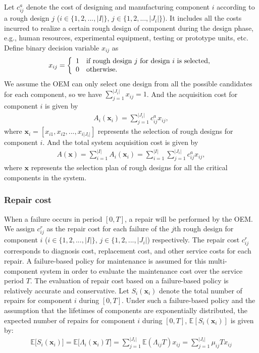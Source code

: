 \documentclass[preprint,12pt]{elsarticle}
\begin{document}
	Let $c_{ij}^{a}$ denote the cost of designing and manufacturing component $i$ according to a rough design $j$ ($i \in \{1,2,...,\lvert I \rvert\}$, $j \in \{1,2,...,\lvert J_{i}\rvert\}$). It includes all the costs incurred to realize a certain rough design of component during the design phase, e.g., human resources, experimental equipment, testing or prototype units, etc. Define binary decision variable $x_{ij}$ as
	\[ x_{ij} = \left \{
	  \begin{array} {l l}
         1 & \textrm {if rough design $j$ for design $i$ is selected,}\\
         0 & \textrm {otherwise.}
		\end {array} \right.\]
 We assume the OEM can only select one design from all the possible candidates for each component, so we have $\sum^{\lvert J_{i}\rvert}_{j=1}{x_{ij}=1}$. And the acquisition cost for component $i$ is given by
\begin{eqnarray}
A_{i}(\boldsymbol{x}_{i})=\sum^{\lvert J_{i} \rvert}_{j=1} {c_{ij}^{a} x_{ij}},
\label{Ai}
\end{eqnarray}
where $\boldsymbol{x}_{i}=[x_{i1},x_{i2},...,x_{i\lvert J_{i}\rvert}]$ represents the selection of rough designs for component $i$.
And the total system acquisition cost is given by
\begin{eqnarray}
A(\boldsymbol{x})=\sum ^{\lvert I \rvert}_{i=1}A_{i}(\boldsymbol{x}_{i})=\sum ^{\lvert I \rvert}_{i=1}\sum^{\lvert J_{i} \rvert}_{j=1} {c_{ij}^{a} x_{ij}}, \label{A}
\end{eqnarray}
where $\boldsymbol{x}$ represents the selection plan of rough designs for all the critical components in the system.
	
\subsubsection{Repair cost}
	
When a failure occurs in period $[0, T]$, a repair will be performed by the OEM. We assign $c^r_{ij}$ as the repair cost for each failure of the $j$th rough design for component $i$ ($i \in \{1,2,...,\lvert I \rvert \}$, $j \in \{1,2,..., \lvert J_{i} \rvert $) respectively. The repair cost $c^r_{ij}$ corresponds to diagnosis cost, replacement cost, and other service costs for each repair. A failure-based policy for maintenance is assumed for this multi-component system in order to evaluate the maintenance cost over the service period $T$. The evaluation of repair cost based on a failure-based policy is relatively accurate and conservative. Let $S_{i}(\boldsymbol{x}_{i})$ denote the total number of repairs for component $i$ during $[0,T]$. Under such a failure-based policy and the assumption that the lifetimes of components are exponentially distributed, the expected number of repairs for component $i$ during $[0,T]$, $\mathbb{E}[S_{i}(\boldsymbol{x}_{i})]$ is given by:
\begin {eqnarray}
\mathbb{E}\bigg[S_{i}(\boldsymbol{x}_{i})\bigg]=\mathbb{E}\bigg[\Lambda_{i}(\boldsymbol{x}_{i})T\bigg] =\sum_{j=1}^{\rvert J_{i} \lvert}{\mathbb{E}(\Lambda_{ij}T)x_{ij}}=\sum_{j=1}^{\rvert J_{i} \lvert}{\mu_{ij}T}x_{ij}
\end {eqnarray}
\end{document}
